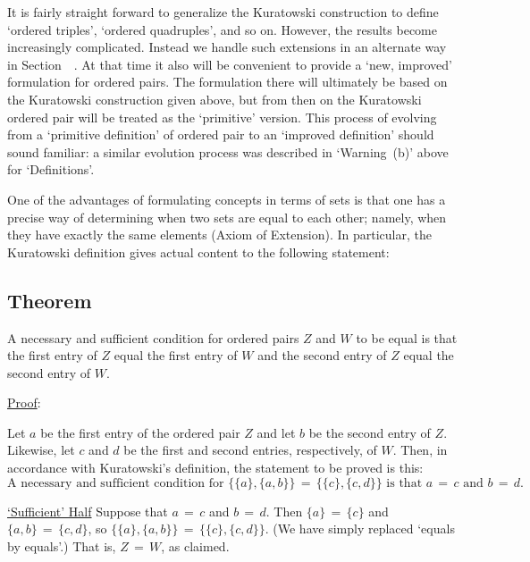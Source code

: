 {\V
\V


        It is fairly straight forward to generalize the Kuratowski construction to define `ordered triples', `ordered quadruples', and so on.
    However, the results become increasingly complicated. Instead we handle such extensions in an alternate way in Section~~.
    At that time it also will be convenient to provide a `new, improved' formulation for ordered pairs.
    The formulation there will ultimately be based on the Kuratowski construction given above,
    but from then on the Kuratowski ordered pair will be treated as the `primitive' version.
    This process of evolving from a `primitive definition' of ordered pair to an `improved definition' should sound familiar:
    a similar evolution process was described in `Warning~(b)' above for `Definitions'.

\V
\V

        One of the advantages of formulating concepts in terms of sets is that one has a precise way of determining when two sets are equal to each other; namely, when they have exactly the same elements (Axiom of Extension).
    In particular, the Kuratowski definition gives actual content to the following statement:


        \subsection{\small{\bf Theorem}}
            \label{ThmA12.20}

        A necessary and sufficient condition for ordered pairs $Z$ and $W$ to be equal is that the first entry of $Z$ equal the first entry of $W$ and the second entry of $Z$ equal the second entry of $W$.

\V

        \underline{Proof}:

        Let $a$ be the first entry of the ordered pair $Z$ and let $b$ be the second entry of $Z$.
    Likewise, let $c$ and $d$ be the first and second entries, respectively, of $W$.
    Then, in accordance with Kuratowski's definition, the statement to be proved is this:
        \begin{displaymath}
        \mbox{A necessary and sufficient condition for } \{\{a\},\{a,b\}\} \,=\, \{\{c\},\{c,d\}\} \mbox{ is that }
    a \,=\, c \mbox{ and } b \,=\, d.
        \end{displaymath}

        \underline{`Sufficient' Half} Suppose that $a \,=\, c$ and $b \,=\, d$.
    Then $\{a\} \,=\, \{c\}$ and $\{a,b\} \,=\, \{c,d\}$, so $\{\{a\}, \{a,b\}\} \,=\, \{\{c\},\{c,d\}\}$.
    (We have simply replaced `equals by equals'.) That is, $Z \,=\, W$, as claimed.

}
